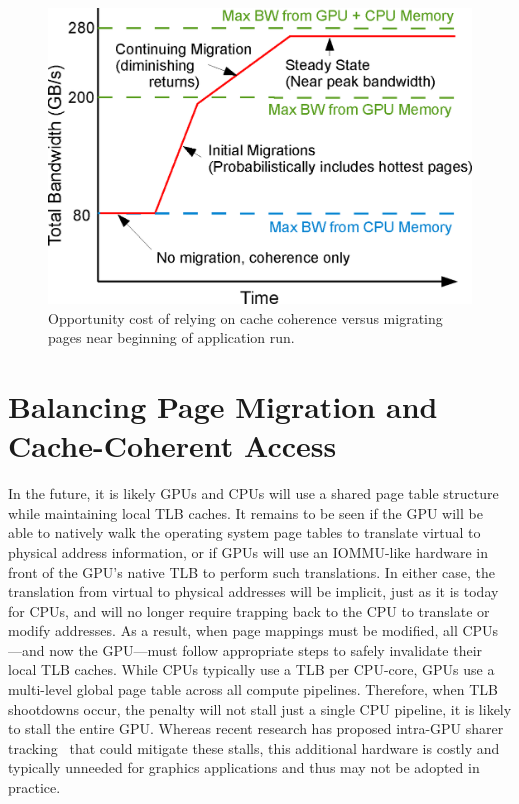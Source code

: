 \begin{figure}[t]
    \includegraphics[width=\columnwidth]{hpca2015/figures/opportunity.eps} 
    \caption{Opportunity cost of relying on cache coherence versus migrating pages near beginning of application run.}
    \label{fig:opportunity}
\end{figure}

\vspace{-0.05in}
\section{Balancing Page Migration and Cache-Coherent Access}
\label{threshold}

In the future, it is likely GPUs and CPUs will use a shared page table structure while maintaining local
TLB caches.  It remains to be seen if the GPU will be able to natively walk the operating system page
tables to translate virtual to physical address information, or if GPUs will use an IOMMU-like hardware
in front of the GPU's native TLB to perform such translations.  In either case,
the translation from virtual to physical addresses will be implicit, just as it is today for CPUs, and will no
longer require trapping back to the CPU to translate or modify addresses.  As a result, when page mappings
must be modified, all CPUs---and now the GPU---must follow appropriate steps to safely invalidate their local
TLB caches.  While CPUs typically use a TLB per CPU-core, GPUs use a multi-level global page table
across all compute pipelines.  Therefore, when TLB shootdowns occur, the penalty will not stall just
a single CPU pipeline, it is likely to stall the entire GPU\@. Whereas recent research has proposed intra-GPU 
sharer tracking~\cite{Villavieja2011} that could mitigate these stalls, this additional 
hardware is costly and typically unneeded for graphics applications and thus may not be adopted in practice.

